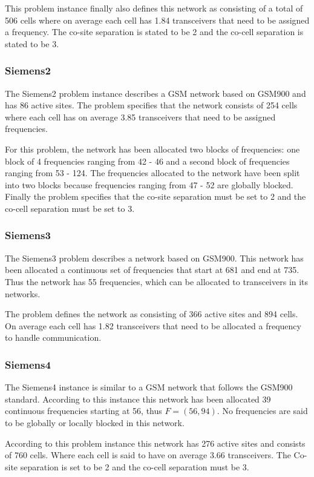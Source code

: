 This problem instance finally also defines this network as consisting of a total of 506 cells where on average each cell has 1.84 transceivers that need to be assigned a frequency. The co-site separation is stated to be 2 and the co-cell separation is stated to be 3.
\subsubsection{Siemens2}
The Siemens2 problem instance describes a GSM network based on GSM900 and has 86 active sites. The problem specifies that the network consists of 254 cells where each cell has on average 3.85 transceivers that need to be assigned frequencies.

For this problem, the network has been allocated two blocks of frequencies: one block of 4 frequencies ranging from 42 - 46 and a second block of frequencies ranging from 53 - 124. The frequencies allocated to the network have been split into two blocks because frequencies ranging from 47 - 52 are globally blocked. Finally the problem specifies that the co-site separation must be set to 2 and the co-cell separation must be set to 3.
\subsubsection{Siemens3}
The Siemens3 problem describes a network based on GSM900. This network has been allocated a continuous set of frequencies that start at 681 and end at 735. Thus the network has 55 frequencies, which can be allocated to transceivers in its networks.

The problem defines the network as consisting of 366 active sites and 894 cells. On average each cell has 1.82 transceivers that need to be allocated a frequency to handle communication.
\subsubsection{Siemens4}
The Siemens4 instance is similar to a GSM network that follows the GSM900 standard. According to this instance this network has been allocated 39 continuous frequencies starting at 56, thus $F = (56,94)$. No frequencies are said to be globally or locally blocked in this network.

According to this problem instance this network has 276 active sites and consists of 760 cells. Where each cell is said to have on average 3.66 transceivers. The Co-site separation is set to be 2 and the co-cell separation must be 3.

